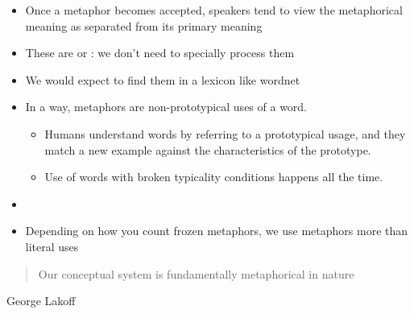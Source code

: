 \documentclass[headrule,footrule]{foils}
\begin{document}
\begin{itemize}
\item Once a metaphor becomes accepted, speakers tend to view the
metaphorical meaning as separated from its primary meaning

\begin{exe}
  \ex {}
  \ex {}
  \ex {}
  \ex {}
  \ex {}
\end{exe}
\item These are  or : we don't need to
  specially process them
\item We would expect to find them in a lexicon like wordnet
\end{itemize}


\begin{itemize}
\item In a way, metaphors are non-prototypical uses of a word.
\begin{itemize}
\item Humans understand words by referring to a prototypical usage,
and they match a new example against the characteristics of the
prototype.
\item  Use of words with broken typicality conditions happens all the
time.
\end{itemize}
\item
  \begin{exe}
    \ex {}
    \ex {}
    \ex {}
    \ex {}
    \ex {}
    \ex {}
  \end{exe}
\item Depending on how you count frozen metaphors, 
we use metaphors more than literal uses
\end{itemize}


\begin{quote}
  \Large Our conceptual system is fundamentally
metaphorical in nature
\end{quote}
\begin{flushright}
  George Lakoff
\end{flushright}
\end{document}
